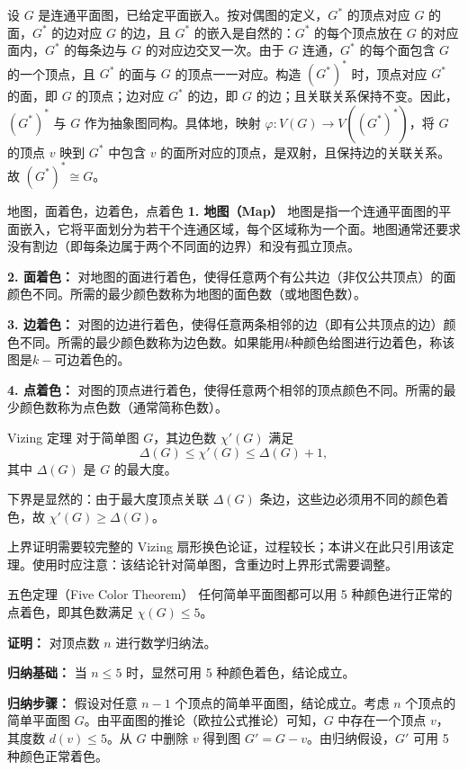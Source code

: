 设 $G$ 是连通平面图，已给定平面嵌入。按对偶图的定义，$G^*$ 的顶点对应 $G$ 的面，$G^*$ 的边对应 $G$ 的边，且 $G^*$ 的嵌入是自然的：$G^*$ 的每个顶点放在 $G$ 的对应面内，$G^*$ 的每条边与 $G$ 的对应边交叉一次。由于 $G$ 连通，$G^*$ 的每个面包含 $G$ 的一个顶点，且 $G^*$ 的面与 $G$ 的顶点一一对应。构造 $(G^*)^*$ 时，顶点对应 $G^*$ 的面，即 $G$ 的顶点；边对应 $G^*$ 的边，即 $G$ 的边；且关联关系保持不变。因此，$(G^*)^*$ 与 $G$ 作为抽象图同构。具体地，映射 $\varphi: V(G) \to V((G^*)^*)$，将 $G$ 的顶点 $v$ 映到 $G^*$ 中包含 $v$ 的面所对应的顶点，是双射，且保持边的关联关系。故 $(G^*)^* \cong G$。
\begin{definition}{地图，面着色，边着色，点着色}{}
\textbf{1. 地图（Map）}
地图是指一个连通平面图的平面嵌入，它将平面划分为若干个连通区域，每个区域称为一个面。地图通常还要求没有割边（即每条边属于两个不同面的边界）和没有孤立顶点。

\textbf{2. 面着色：}
对地图的面进行着色，使得任意两个有公共边（非仅公共顶点）的面颜色不同。所需的最少颜色数称为地图的面色数（或地图色数）。

\textbf{3. 边着色：}
对图的边进行着色，使得任意两条相邻的边（即有公共顶点的边）颜色不同。所需的最少颜色数称为边色数。如果能用$k$种颜色给图进行边着色，称该图是$k-$可边着色的。

\textbf{4. 点着色：}
对图的顶点进行着色，使得任意两个相邻的顶点颜色不同。所需的最少颜色数称为点色数（通常简称色数）。
\end{definition}
\begin{theorem}{Vizing 定理}{}
    对于简单图 $G$，其边色数 $\chi'(G)$ 满足
    \[
    \Delta(G) \le \chi'(G) \le \Delta(G) + 1,
    \]
    其中 $\Delta(G)$ 是 $G$ 的最大度。
\end{theorem}
下界是显然的：由于最大度顶点关联 $\Delta(G)$ 条边，这些边必须用不同的颜色着色，故 $\chi'(G) \ge \Delta(G)$。

上界证明需要较完整的 Vizing 扇形换色论证，过程较长；本讲义在此只引用该定理。使用时应注意：该结论针对简单图，含重边时上界形式需要调整。

\begin{theorem}{五色定理（Five Color Theorem）}{}
    任何简单平面图都可以用 5 种颜色进行正常的点着色，即其色数满足 $\chi(G) \le 5$。
\end{theorem}
\textbf{证明：} 对顶点数 $n$ 进行数学归纳法。

    \textbf{归纳基础：} 当 $n \le 5$ 时，显然可用 5 种颜色着色，结论成立。

    \textbf{归纳步骤：} 假设对任意 $n-1$ 个顶点的简单平面图，结论成立。考虑 $n$ 个顶点的简单平面图 $G$。由平面图的推论（欧拉公式推论）可知，$G$ 中存在一个顶点 $v$，其度数 $d(v) \le 5$。从 $G$ 中删除 $v$ 得到图 $G' = G - v$。由归纳假设，$G'$ 可用 5 种颜色正常着色。


